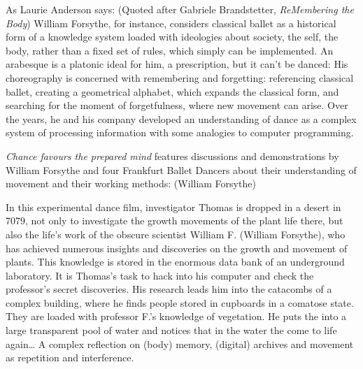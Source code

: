 {{As Laurie Anderson says: 
\blank
{} (Quoted after
Gabriele Brandstetter, {\em ReMembering the Body})
\blank
William Forsythe, for instance, considers classical ballet as a
historical form of a knowledge system loaded with ideologies about
society, the self, the body, rather than a fixed set of rules, which
simply can be implemented. An arabesque is a platonic ideal for him, a
prescription, but it can't be danced:  His choreography is concerned with
remembering and forgetting: referencing classical ballet, creating a
geometrical alphabet, which expands the classical form, and searching
for the moment of forgetfulness, where new movement can arise. Over the
years, he and his company developed an understanding of dance as a
complex system of processing information with some analogies to
computer programming. 



{\em Chance favours the prepared mind} features discussions and
demonstrations by William Forsythe and four Frankfurt Ballet Dancers
about their understanding of movement and their working methods:  (William
Forsythe)



In this experimental dance film, investigator Thomas is dropped in a
desert in 7079, not only to investigate the growth movements of the
plant life there, but also the life's work of the obscure scientist
William F. (William Forsythe), who has achieved numerous insights and
discoveries on the growth and movement of plants. This knowledge is
stored in the enormous data bank of an underground laboratory. It is
Thomas's task to hack into his computer and check the professor's
secret discoveries. His research leads him into the catacombs of a
complex building, where he finds people stored in cupboards in a
comatose state. They are loaded with professor F.'s knowledge
of vegetation. He puts the  into a large transparent
pool of water and notices that in the water the  come to life
again{\dots} A complex reflection on (body) memory, (digital) archives
and movement as repetition and interference.

}}
